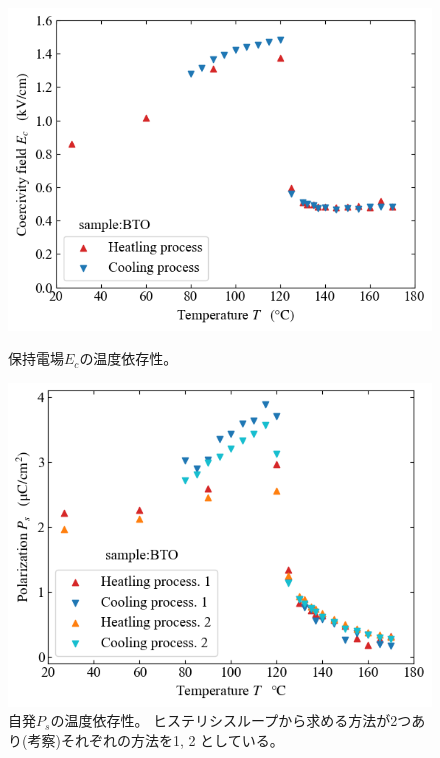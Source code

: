 \documentclass[9pt,dvipdfmx,a4paper]{jsarticle}
\begin{document}
\begin{figure}[H]
    \begin{minipage}[t]{0.48\columnwidth}
        \centering
        \includegraphics[width=\columnwidth]{BTO_Ec-T.png}
        \caption{\small{保持電場\(E_c\)の温度依存性。}}
        \label{graph:BTO_Ec-T_temp}
    \end{minipage}
    \hfill
    \begin{minipage}[t]{0.48\columnwidth}
        \centering
        \includegraphics[width=\columnwidth]{BTO_Ps-T.png}
        \caption{\small{自発\(P_s\)の温度依存性。
        ヒステリシスループから求める方法が2つあり(考察)それぞれの方法を1, 2 としている。}}
        \label{graph:BTO_Ps-T}
    \end{minipage}
\end{figure}
\end{document}
